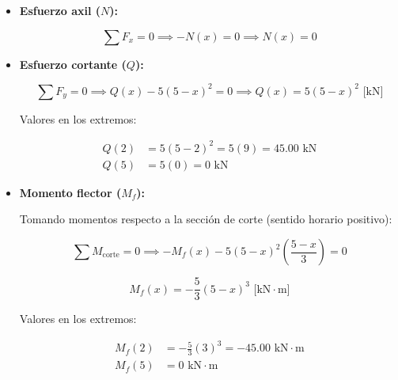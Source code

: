 \begin{itemize}

    \item \textbf{Esfuerzo axil ($N$):}

          \begin{equation}

              \sum F_x = 0 \implies -N(x) = 0 \implies \boxed{N(x) = 0}

          \end{equation}

    \item \textbf{Esfuerzo cortante ($Q$):}

          \begin{equation}

              \sum F_y = 0 \implies Q(x) - 5(5 - x)^2 = 0 \implies \boxed{Q(x) = 5(5 - x)^2\text{ [kN]}}

          \end{equation}

          Valores en los extremos:

          \begin{align*}

              Q(2) & = 5(5 - 2)^2 = 5(9) = 45.00\text{ kN} \\

              Q(5) & = 5(0) = 0\text{ kN}

          \end{align*}

    \item \textbf{Momento flector ($M_f$):}

          Tomando momentos respecto a la sección de corte (sentido horario positivo):

          \begin{equation}

              \sum M_{\text{corte}} = 0 \implies -M_f(x) - 5(5 - x)^2 \left(\frac{5 - x}{3}\right) = 0

          \end{equation}

          \begin{equation}

              \boxed{M_f(x) = -\frac{5}{3}(5 - x)^3\text{ [kN}\cdot\text{m]}}

          \end{equation}

          Valores en los extremos:

          \begin{align*}

              M_f(2) & = -\frac{5}{3}(3)^3 = -45.00\text{ kN}\cdot\text{m} \\

              M_f(5) & = 0\text{ kN}\cdot\text{m}

          \end{align*}

\end{itemize}







